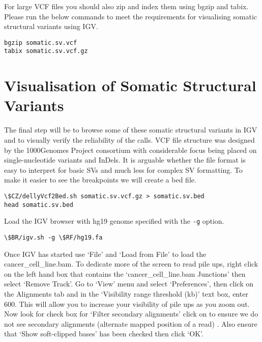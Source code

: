 \begin{steps}
\begin{information}
For large VCF files you should also zip and index them using bgzip and tabix. Please run the below commands to meet the requirements for visualising somatic structural variants using IGV.  
\end{information}

\begin{steps}
\begin{lstlisting}
bgzip somatic.sv.vcf
tabix somatic.sv.vcf.gz
\end{lstlisting}
\end{steps}



\section{Visualisation of Somatic Structural Variants}

\begin{information}
The final step will be to browse some of these somatic structural variants in IGV and to visually verify the reliability of the calls. VCF file structure was designed by the 1000Genomes Project consortium with considerable focus being placed on single-nucleotide variants and InDels. It is arguable whether the file format is easy to interpret for basic SVs and much less for complex SV formatting. To make it easier to see the breakpoints we will create a bed file. 

\end{information}
\begin{steps}
\begin{lstlisting}
\$CZ/dellyVcf2Bed.sh somatic.sv.vcf.gz > somatic.sv.bed
head somatic.sv.bed
\end{lstlisting}
\end{steps}

\begin{steps}
Load the IGV browser with hg19 genome specified with the \texttt{-g} option.
\begin{lstlisting}
\$BR/igv.sh -g \$RF/hg19.fa
\end{lstlisting}
\end{steps}

\begin{information}
Once IGV has started use ‘File’ and ‘Load from File’ to load the cancer_cell_line.bam. To dedicate more of the screen to read pile ups, right click on the left hand box that contains the ‘cancer_cell_line.bam Junctions’ then select ‘Remove Track’. Go to ‘View’ menu and select ‘Preferences’, then click on the Alignments tab and in the ‘Visibility range threshold (kb)’ text box, enter 600. This will allow you to increase your visibility of pile ups as you zoom out. Now look for check box for ‘Filter secondary alignments’ click on to ensure we do not see secondary alignments (alternate mapped position of a read) . Also ensure that ‘Show soft-clipped bases’ has been checked then click ‘OK’.
 

\end{information}
\end{steps}
